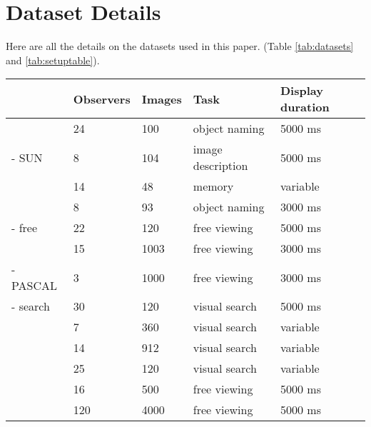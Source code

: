 \section{Dataset Details}

Here are all the details on the datasets used in this paper. (Table \ref{tab:datasets} and \ref{tab:setuptable}).


\begin{table*}
\centering
\small
\begin{tabular}{l|llll}
 						& Observers & Images &  Task & Display duration\\
\hline
\cite{clarke2013}     	& 24   	& 100   & object naming & 5000 ms\\
\cite{yun2013} - SUN    & 8     & 104   & image description & 5000 ms\\
\cite{tatler2005}     	& 14    & 48    & memory 			& variable\\
\cite{einhauser2008} 	& 8		& 93    & object naming 	& 3000 ms \\
\cite{tatler2007} - free & 22   & 120   & free viewing      & 5000 ms\\
\cite{judd2009}         & 15 	& 1003  & free viewing 		& 3000 ms\\
\cite{yun2013} - PASCAL & 3 	& 1000  & free viewing 		& 3000 ms\\
\cite{tatler2007} - search & 30 & 120	& visual search 	& 5000 ms\\
\hline
\cite{clarke2009} 		& 7		& 360	& visual search 	& variable\\
\cite{ehinger2009}     	& 14 	& 912 	& visual search 	& variable\\
\cite{asher2013}    	& 25    & 120   & visual search		& variable\\
\cite{jiang2014}  		& 16 	& 500 	& free viewing  	& 5000 ms \\
\cite{borji2015}  		& 120	& 4000  & free viewing		& 5000 ms\\
\end{tabular}

\caption{Summary of the 13 datasets used throughout this study.}
\label{tab:datasets}
\end{table*}

